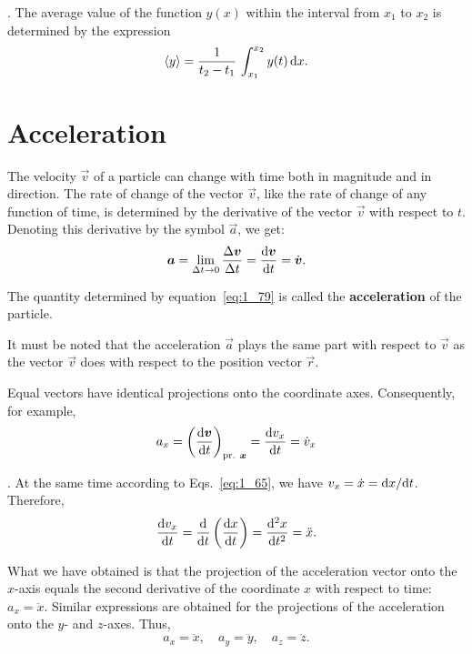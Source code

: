 . The average value of the function $y(x)$ within the interval from $x_1$ to $x_2$ is determined by the expression
\begin{equation}\label{eq:1_78}
\left\langle y \right\rangle = \frac{1}{t_2-t_1}\,\int_{x_1}^{x_2}y(t)\,\mathrm{d}x.
\end{equation}

\section{Acceleration}\label{sec:1_4}

The velocity $\vec{v}$ of a particle can change with time both in magnitude and in direction. The rate of change of the vector $\vec{v}$, like the rate of change of any function of time, is determined by the derivative of the vector $\vec{v}$ with respect to $t$. Denoting this derivative by the symbol $\vec{a}$, we get:
\begin{equation}\label{eq:1_79}
\boldsymbol{a} = \lim_{\Delta t\to 0}\frac{\Delta\boldsymbol{v}}{\Delta t} = \frac{\mathrm{d}\boldsymbol{v}}{\mathrm{d} t} = \dot{\boldsymbol{v}}.
\end{equation}

\noindent
The quantity determined by equation~\eqref{eq:1_79} is called the \textbf{acceleration} of the particle.

It must be noted that the acceleration $\vec{a}$ plays the same part with respect to $\vec{v}$ as the vector $\vec{v}$ does with respect to the position vector $\vec{r}$.

Equal vectors have identical projections onto the coordinate axes. Consequently, for example,
\begin{equation*}
a_x = \left(\frac{\mathrm{d}\boldsymbol{v}}{\mathrm{d} t}\right)_{\text{pr. }\boldsymbol{x}} = \frac{\mathrm{d} v_x}{\mathrm{d} t} = \dot{v}_x
\end{equation*}

. At the same time according to Eqs.~\eqref{eq:1_65}, we have $v_x=\dot{x}=\mathrm{d} x/\mathrm{d} t$. Therefore,
\begin{equation*}
\frac{\mathrm{d} v_x}{\mathrm{d} t} = \frac{\mathrm{d}}{\mathrm{d}t} \left(\frac{\mathrm{d} x}{\mathrm{d} t}\right) = \frac{\mathrm{d}^2x}{\mathrm{d} t^2} = \ddot{x}.
\end{equation*}

\noindent
What we have obtained is that the projection of the acceleration vector onto the $x$-axis equals the second derivative of the coordinate $x$ with respect to time: $a_x=\ddot{x}$. Similar expressions are obtained for the projections of the acceleration onto the $y$- and $z$-axes. Thus,
\begin{equation}\label{eq:1_80}
a_x=\ddot{x},\quad a_y=\ddot{y},\quad a_z=\ddot{z}.
\end{equation}

